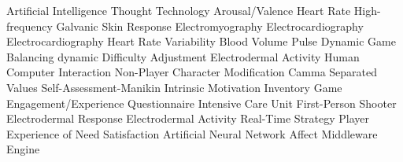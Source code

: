    {Artificial Intelligence}
   {Thought Technology}
   {Arousal/Valence}
   {Heart Rate}
   {High-frequency}
  {Galvanic Skin Response}
  {Electromyography}
  {Electrocardiography}
  {Electrocardiography}
  {Heart Rate Variability}
  {Blood Volume Pulse}
  {Dynamic Game Balancing}
  {dynamic Difficulty Adjustment}
  {Electrodermal Activity}
  {Human Computer Interaction}
  {Non-Player Character}
  {Modification}
  {Camma Separated Values}
  {Self-Assessment-Manikin}
  {Intrinsic Motivation Inventory}
  {Game Engagement/Experience Questionnaire}
  {Intensive Care Unit}
  {First-Person Shooter}
  {Electrodermal Response}
  {Electrodermal Activity}
  {Real-Time Strategy}
 {Player Experience of Need Satisfaction}
  {Artificial Neural Network}
  {Affect Middleware Engine}
